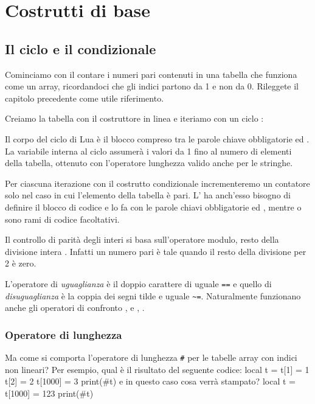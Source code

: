 

\chapter{Costrutti di base}

\section{Il ciclo  e il condizionale }

Cominciamo con il contare i numeri pari contenuti in una tabella che funziona
come un array, ricordandoci che gli indici partono da 1 e non da 0. Rileggete
il capitolo precedente come utile riferimento.

Creiamo la tabella con il costruttore in linea e iteriamo con un ciclo
:

Il corpo del ciclo  di Lua è il blocco compreso tra le parole chiave
obbligatorie  ed . La variabile  interna al ciclo
assumerà i valori da 1 fino al numero di elementi della tabella, ottenuto con
l'operatore lunghezza \key{\#} valido anche per le stringhe.

Per ciascuna iterazione con il costrutto condizionale  incrementeremo un
contatore solo nel caso in cui l'elemento della tabella è pari. L' ha
anch'esso bisogno di definire il blocco di codice e lo fa con le parole chiavi
obbligatorie  ed , mentre  o  sono rami
di codice facoltativi.

Il controllo di parità degli interi si basa sull'operatore modulo, resto della
divisione intera \key{\%}. Infatti un numero pari è tale quando il resto della
divisione per 2 è zero. 

L'operatore di \emph{uguaglianza} è il doppio carattere di uguale \texttt{==} e
quello di \emph{disuguaglianza} è la coppia dei segni tilde e uguale
\verb|~=|. Naturalmente funzionano anche gli operatori di confronto \key{>},
\key{>=} e \key{<}, \key{<=}.


\subsection{Operatore di lunghezza}

Ma come si comporta l'operatore di lunghezza \texttt{\#} per le tabelle array
con indici non lineari? Per esempio, qual è il risultato del seguente codice:
\lines
local t = {}
t[1] = 1
t[2] = 2
t[1000] = 3
print(#t)
\endlines
{}
e in questo caso cosa verrà stampato?
\lines
local t = {}
t[1000] = 123
print(#t)
\endlines
{}

